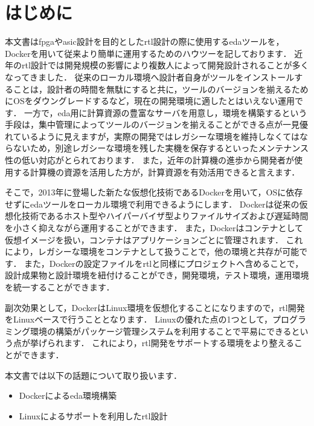 \section{はじめに}

本文書は\ac{fpga}や\ac{asic}設計を目的とした\ac{rtl}設計の際に使用する\ac{eda}ツールを，Dockerを用いて従来より簡単に運用するためのハウツーを記しております．
近年の\ac{rtl}設計では開発規模の影響により複数人によって開発設計されることが多くなってきました．
従来のローカル環境へ設計者自身がツールをインストールすることは，設計者の時間を無駄にすると共に，ツールのバージョンを揃えるためにOSをダウングレードするなど，現在の開発環境に適したとはいえない運用です．
一方で，\ac{eda}用に計算資源の豊富なサーバを用意し，環境を構築するという手段は，集中管理によってツールのバージョンを揃えることができる点が一見優れているように見えますが，実際の開発ではレガシーな環境を維持しなくてはならないため，別途レガシーな環境を残した実機を保存するといったメンテナンス性の低い対応がとられております．
また，近年の計算機の進歩から開発者が使用する計算機の資源を活用した方が，計算資源を有効活用できると言えます．

そこで，2013年に登場した新たな仮想化技術であるDockerを用いて，OSに依存せずに\ac{eda}ツールをローカル環境で利用できるようにします．
Dockerは従来の仮想化技術であるホスト型やハイパーバイザ型よりファイルサイズおよび遅延時間を小さく抑えながら運用することができます．
また，Dockerはコンテナとして仮想イメージを扱い，コンテナはアプリケーションごとに管理されます．
これにより，レガシーな環境をコンテナとして扱うことで，他の環境と共存が可能です．
また，Dockerの設定ファイルを\ac{rtl}と同様にプロジェクトへ含めることで，設計成果物と設計環境を紐付けることができ，開発環境，テスト環境，運用環境を統一することができます．

副次効果として，DockerはLinux環境を仮想化することになりますので，\ac{rtl}開発をLinuxベースで行うこととなります．
Linuxの優れた点の1つとして，プログラミング環境の構築がパッケージ管理システムを利用することで平易にできるという点が挙げられます．
これにより，\ac{rtl}開発をサポートする環境をより整えることができます．

本文書では以下の話題について取り扱います．

\begin{itemize}
  \item Dockerによる\ac{eda}環境構築
  \item Linuxによるサポートを利用した\ac{rtl}設計
\end{itemize}
